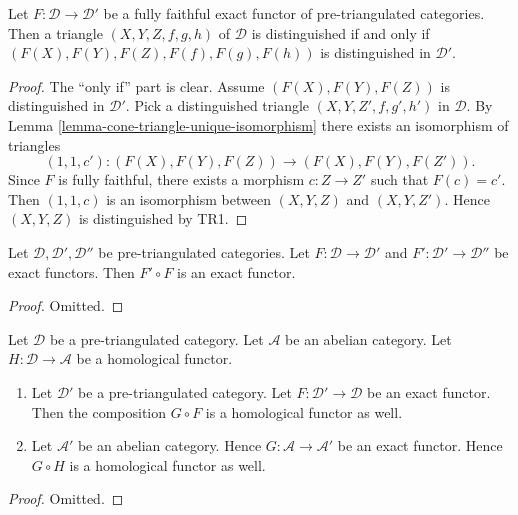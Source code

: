 \begin{lemma}
\label{lemma-exact-equivalence}
Let $F : \mathcal{D} \to \mathcal{D}'$ be a fully faithful exact functor
of pre-triangulated categories. Then a triangle $(X, Y, Z, f, g, h)$
of $\mathcal{D}$ is distinguished if and only if
$(F(X), F(Y), F(Z), F(f), F(g), F(h))$ is distinguished in $\mathcal{D}'$.
\end{lemma}

\begin{proof}
The ``only if'' part is clear. Assume $(F(X), F(Y), F(Z))$ is
distinguished in $\mathcal{D}'$. Pick a distinguished triangle
$(X, Y, Z', f, g', h')$ in $\mathcal{D}$. By
Lemma \ref{lemma-cone-triangle-unique-isomorphism}
there exists an isomorphism of triangles
$$
(1, 1, c') : (F(X), F(Y), F(Z)) \longrightarrow (F(X), F(Y), F(Z')).
$$
Since $F$ is fully faithful, there exists a morphism $c : Z \to Z'$
such that $F(c) = c'$. Then $(1, 1, c)$ is an isomorphism between
$(X, Y, Z)$ and $(X, Y, Z')$. Hence $(X, Y, Z)$ is distinguished
by TR1.
\end{proof}

\begin{lemma}
\label{lemma-composition-exact}
Let $\mathcal{D}, \mathcal{D}', \mathcal{D}''$ be pre-triangulated categories.
Let $F : \mathcal{D} \to \mathcal{D}'$ and
$F' : \mathcal{D}' \to \mathcal{D}''$ be exact functors.
Then $F' \circ F$ is an exact functor.
\end{lemma}

\begin{proof}
Omitted.
\end{proof}

\begin{lemma}
\label{lemma-exact-compose-homological-functor}
Let $\mathcal{D}$ be a pre-triangulated category.
Let $\mathcal{A}$ be an abelian category.
Let $H : \mathcal{D} \to \mathcal{A}$ be a homological functor.
\begin{enumerate}
\item Let $\mathcal{D}'$ be a pre-triangulated category.
Let $F : \mathcal{D}' \to \mathcal{D}$ be an exact functor.
Then the composition $G \circ F$ is a homological functor as well.
\item Let $\mathcal{A}'$ be an abelian category. Hence
$G : \mathcal{A} \to \mathcal{A}'$ be an exact functor.
Hence $G \circ H$ is a homological functor as well.
\end{enumerate}
\end{lemma}

\begin{proof}
Omitted.
\end{proof}

